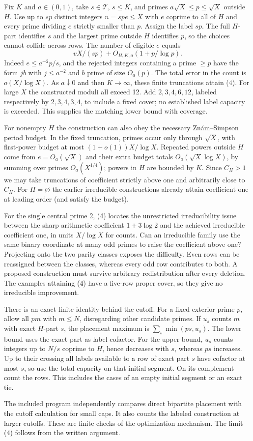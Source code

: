 \newpage
{}
Fix $K$ and $a\in(0,1)$, take $s\in\mathcal T$, $s\le K$, and primes $a\sqrt X\le p\le\sqrt X$ outside $H$. Use up to $sp$ distinct integers $n=spe\le X$ with $e$ coprime to all of $H$ and every prime dividing $e$ strictly smaller than $p$. Assign the label $sp$. The full $H$-part identifies $s$ and the largest prime outside $H$ identifies $p$, so the choices cannot collide across rows. The number of eligible $e$ equals
\[
 vX/(sp)+O_{H,K,a}(1+p/\log p).
\]
Indeed $e\le a^{-2}p/s$, and the rejected integers containing a prime $\ge p$ have the form $jb$ with $j\le a^{-2}$ and $b$ prime of size $O_a(p)$. The total error in the count is $o(X/\log X)$. As $a\downarrow0$ and then $K\to\infty$, these finite truncations attain (4). For large $X$ the constructed moduli all exceed 12. Add $2,3,4,6,12$, labeled respectively by $2,3,4,3,4$, to include a fixed cover; no established label capacity is exceeded. This supplies the matching lower bound with coverage.

For nonempty $H$ the construction can also obey the necessary Zn\'am--Simpson period budget. In the fixed truncation, primes occur only through $\sqrt X$, with first-power budget at most $(1+o(1))X/\log X$. Repeated powers outside $H$ come from $e=O_a(\sqrt X)$ and their extra budget totals $O_a(\sqrt X\log X)$, by summing over primes $O_a(X^{1/4})$; powers in $H$ are bounded by $K$. Since $C_H>1$ we may take truncations of coefficient strictly above one and arbitrarily close to $C_H$. For $H=\varnothing$ the earlier irreducible constructions already attain coefficient one at leading order (and satisfy the budget).

For the single central prime 2, (4) locates the unrestricted irreducibility issue between the sharp arithmetic coefficient $1+3\log 2$ and the achieved irreducible coefficient one, in units $X/\log X$ for counts. Can an irreducible family use the same binary coordinate at many odd primes to raise the coefficient above one? Projecting onto the two parity classes exposes the difficulty. Even rows can be reassigned between the classes, whereas every odd row contributes to both. A proposed construction must survive arbitrary redistribution after every deletion. The examples attaining (4) have a five-row proper cover, so they give no irreducible improvement.

There is an exact finite identity behind the cutoff. For a fixed exterior prime $p$, allow all $pm$ with $m\le N$, disregarding other candidate primes. If $u_s$ counts $m$ with exact $H$-part $s$, the placement maximum is $\sum_s\min(ps,u_s)$. The lower bound uses the exact part as label cofactor. For the upper bound, $u_s$ counts integers up to $N/s$ coprime to $H$, hence decreases with $s$, whereas $ps$ increases. Up to their crossing all labels available to a row of exact part $s$ have cofactor at most $s$, so use the total capacity on that initial segment. On its complement count the rows. This includes the cases of an empty initial segment or an exact tie.

The included program independently compares direct bipartite placement with the cutoff calculation for small caps. It also counts the labeled construction at larger cutoffs. These are finite checks of the optimization mechanism. The limit (4) follows from the written argument.
